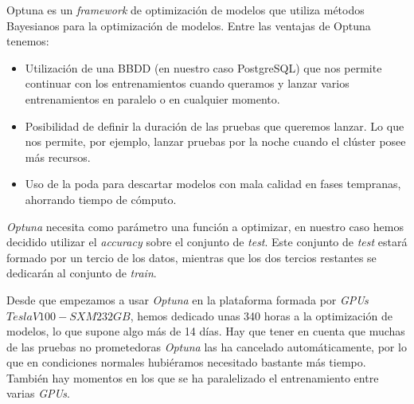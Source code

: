 Optuna es un \textit{framework} de optimización de modelos que utiliza métodos Bayesianos para la optimización de modelos.  Entre las ventajas de Optuna tenemos: 

\begin{itemize}
\item Utilización de una BBDD (en nuestro caso PostgreSQL) que nos permite continuar con los entrenamientos cuando queramos y lanzar varios entrenamientos en paralelo o en cualquier momento. 
\item Posibilidad de definir la duración de las pruebas que queremos lanzar. Lo que nos permite, por ejemplo, lanzar pruebas por la noche cuando el clúster posee más recursos.  

\item Uso de la poda para descartar modelos con mala calidad en fases tempranas, ahorrando tiempo de cómputo. 
\end{itemize}


\textit{Optuna} necesita como parámetro una función a optimizar, en nuestro caso hemos decidido utilizar el \textit{accuracy} sobre el conjunto de \textit{test}. Este conjunto de \textit{test} estará formado por un tercio de los datos, mientras que los dos tercios restantes se dedicarán al conjunto de \textit{train}.


Desde que empezamos a usar \textit{Optuna} en la plataforma formada por \textit{GPUs} $Tesla V100-SXM2 32GB$, hemos dedicado unas 340 horas a la optimización de modelos, lo que supone algo más de 14 días. Hay que tener en cuenta que muchas de las pruebas no prometedoras \textit{Optuna} las ha cancelado automáticamente, por lo que en condiciones normales hubiéramos necesitado bastante más tiempo. También hay momentos en los que se ha paralelizado el entrenamiento entre varias \textit{GPUs}.



